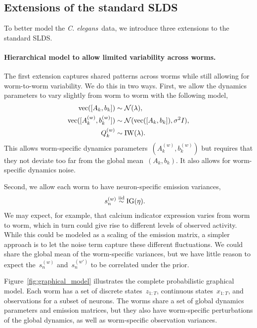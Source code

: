 \documentclass[11pt]{article}
\newcommand{\celegans}{\textit{C. elegans}}
\begin{document}
\subsection{Extensions of the standard SLDS}
\label{sec:extensions}

To better model the \celegans~data, we introduce three extensions
to the standard SLDS.

\paragraph{Hierarchical model to allow limited variability across worms.}
The first extension captures shared patterns across worms while
still allowing for worm-to-worm variability.  We do this in
two ways. First, we allow the dynamics parameters to vary
slightly from worm to worm with the following model,
\begin{align*}
  \mathrm{vec}([A_k, b_k]) &\sim \mathcal{N}(\lambda), \\
  \mathrm{vec}([A_k^{(w)}, b_k^{(w)}]) &\sim \mathcal{N}(\mathrm{vec}([A_k, b_k]), \sigma^2 I), \\
  Q_k^{(w)} &\sim \mathrm{IW}(\lambda).
\end{align*}
This allows worm-specific dynamics parameters~$(A_k^{(w)}, b_k^{(w)})$ but
requires that they not deviate too far from the global mean~$(A_k, b_k)$.
It also allows for worm-specific dynamics noise. 

Second, we allow each worm to have neuron-specific emission variances,
\begin{align*}
  s_{n}^{(w)} & \stackrel{\text{iid}}{\sim} \mathrm{IG}(\eta).
\end{align*}
We may expect, for example, that calcium indicator expression
varies from worm to worm, which in turn could give rise to
different levels of observed activity.  While this could be
modeled as a scaling of the emission matrix, a simpler approach
is to let the noise term capture these different fluctuations.
We could share the global mean of the worm-specific variances,
but we have little reason to expect the~$s_{n}^{(w)}$ and~$s_{n}^{(w')}$
to be correlated under the prior. 

Figure~\ref{fig:graphical_model} illustrates the complete
probabilistic graphical model.  Each worm has a set of discrete
states~$z_{1:T}$, continuous states~$x_{1:T}$, and observations for a
subset of neurons.  The worms share a set of global dynamics
parameters and emission matrices, but they also have worm-specific
perturbations of the global dynamics, as well as worm-specific
observation variances.
\end{document}
